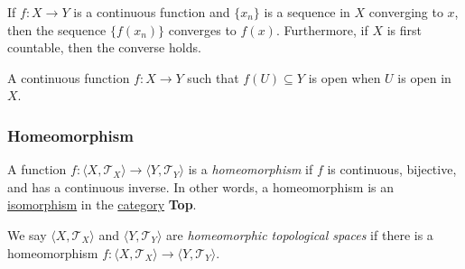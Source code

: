 \begin{corollary}
If $f:X \rightarrow Y$ is a continuous function and $\{ x_n \}$ is a sequence in $X$ converging to $x$, then the sequence $\{ f(x_n) \}$ converges
to $f(x)$. Furthermore, if $X$ is first countable, then the converse holds.
\end{corollary}

\label{openmappings}
A continuous function $f : X \rightarrow Y$ such that $f(U) \subseteq Y$ is open when $U$ is open in $X$.

\subsubsection{Homeomorphism}\label{homeomorphism}
A function $f : \langle X,\mathcal{T}_X \rangle \rightarrow \langle Y,\mathcal{T}_Y \rangle$ is a \emph{homeomorphism} if $f$ is continuous, bijective, and has a continuous inverse. In other words, a homeomorphism is
an \hyperref[isomorphism]{isomorphism} in the \hyperref[category]{category} \textbf{Top}.

\label{homeomorphicspaces}
We say $\langle X,\mathcal{T}_X \rangle$ and $\langle Y,\mathcal{T}_Y \rangle$ are \emph{homeomorphic topological spaces} if there is a homeomorphism $f:\langle X,\mathcal{T}_X \rangle \rightarrow \langle Y,\mathcal{T}_Y \rangle$.